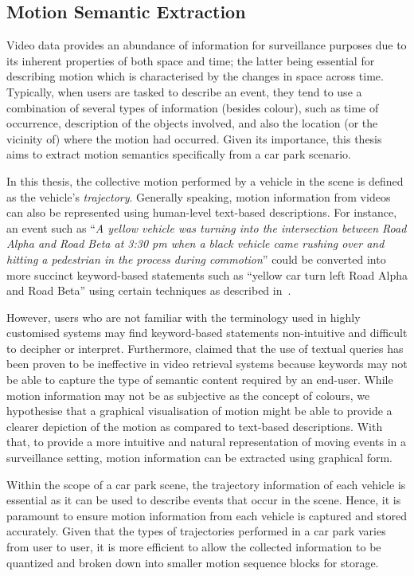\vspace{1em}
\subsection{Motion Semantic Extraction}
\label{section:motionextraction}

Video data provides an abundance of information for surveillance purposes due to its inherent properties of both space and time; the latter being essential for describing motion which is characterised by the changes in space across time.
Typically, when users are tasked to describe an event, they tend to use a combination of several types of information (besides colour), such as time of occurrence, description of the objects involved, and also the location (or the vicinity of) where the motion had occurred.
Given its importance, this thesis aims to extract motion semantics specifically from a car park scenario.

In this thesis, the collective motion performed by a vehicle in the scene is defined as the vehicle's \emph{trajectory}.
Generally speaking, motion information from videos can also be represented using human-level text-based descriptions. For instance, an event such as ``\textit{A yellow vehicle was turning into the intersection between Road Alpha and Road Beta at 3:30 pm when a black vehicle came rushing over and hitting a pedestrian in the process during commotion}'' could be converted into more succinct keyword-based statements such as ``yellow car turn left Road Alpha and Road Beta'' using certain techniques as described in~\cite{feris2012large,momin2015vehicle,yang2015semantic}.

However, users who are not familiar with the terminology used in highly customised systems may find keyword-based statements non-intuitive and difficult to decipher or interpret.
Furthermore,  claimed that the use of textual queries has been proven to be ineffective in video retrieval systems because keywords may not be able to capture the type of semantic content required by an end-user.
While motion information may not be as subjective as the concept of colours, we hypothesise that a graphical visualisation of motion might be able to provide a clearer depiction of the motion as compared to text-based descriptions.
With that, to provide a more intuitive and natural representation of moving events in a surveillance setting, motion information can be extracted using graphical form.

Within the scope of a car park scene, the trajectory information of each vehicle is essential as it can be used to describe events that occur in the scene.
Hence, it is paramount to ensure motion information from each vehicle is captured and stored accurately.
Given that the types of trajectories performed in a car park varies from user to user, %
it is more efficient to allow the collected information to be quantized and broken down into smaller motion sequence blocks for storage.

